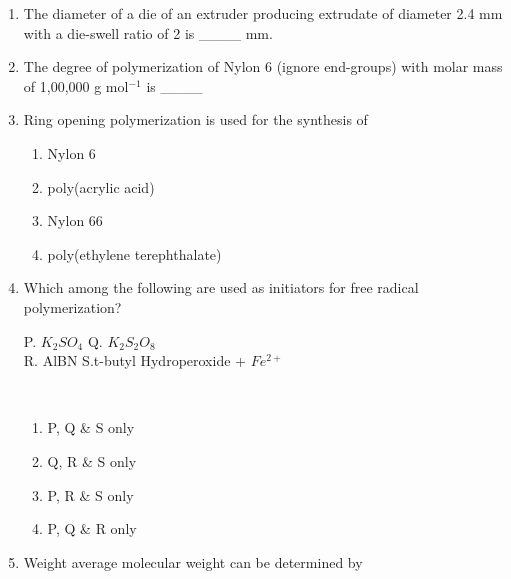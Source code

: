 \documentclass[journal,12pt,onecolumn]{IEEEtran}
\begin{document}
\begin{enumerate}[label=\arabic*)]
\vspace{0.5cm}

\item The diameter of a die of an extruder producing extrudate of diameter 2.4 mm with a die-swell ratio of 2 is \_\_\_\_ mm.
\hfill{} \\
\vspace{0.5cm}

\item The degree of polymerization of Nylon 6 (ignore end-groups) with molar mass of 1,00,000 g mol$^{-1}$ is \_\_\_\_
\hfill{} \\

\vspace{0.5cm}

\item Ring opening polymerization is used for the synthesis of
\hfill{} \\

\vspace{0.2cm}
\begin{enumerate}[label=\alph*)]
\item Nylon 6
\item poly(acrylic acid)
\item Nylon 66
\item poly(ethylene terephthalate)
\end{enumerate}

\newpage 

\item Which among the following are used as initiators for free radical polymerization?

P. $K_2SO_4$  Q. $K_2S_2O_8$ \\
R. AlBN  S.t-butyl Hydroperoxide + $Fe^{2+}$

 \hfill{} \\
 
\vspace{0.2cm}
\begin{enumerate}[label=\alph*)]
\item P, Q \& S only
\item Q, R \& S only
\item P, R \& S only
\item P, Q \& R only
\end{enumerate}

\vspace{0.5cm}

\item Weight average molecular weight can be determined by
\hfill{} \\


\end{enumerate}
\end{document}
